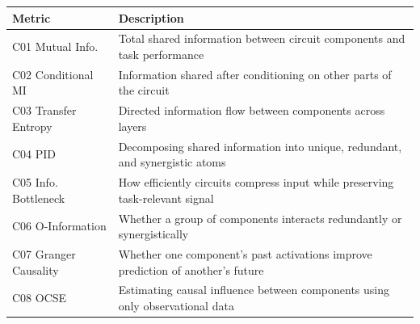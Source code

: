 \documentclass{article}
\begin{document}
\begin{minipage}{\linewidth}
\par
\begin{center}

\begin{tabular}{@{}lp{10cm}@{}}
\toprule
\textbf{Metric} & \textbf{Description} \\
\midrule
C01 Mutual Info. & Total shared information between circuit components and task performance \\
\midrule
C02 Conditional MI & Information shared after conditioning on other parts of the circuit \\
\midrule
C03 Transfer Entropy & Directed information flow between components across layers \\
\midrule
C04 PID & Decomposing shared information into unique, redundant, and synergistic atoms \\
\midrule
C05 Info. Bottleneck & How efficiently circuits compress input while preserving task-relevant signal \\
\midrule
C06 O-Information & Whether a group of components interacts redundantly or synergistically \\
\midrule
C07 Granger Causality & Whether one component's past activations improve prediction of another's future \\
\midrule
C08 OCSE & Estimating causal influence between components using only observational data \\
\midrule
\bottomrule
\end{tabular}
\end{center}
\end{minipage}
\end{document}
